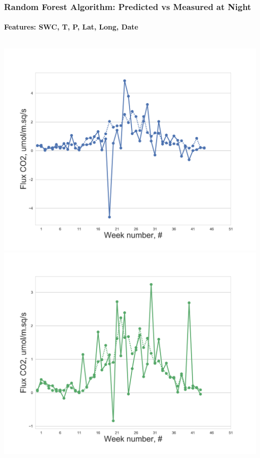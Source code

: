 \documentclass{beamer}
\begin{document}
\begin{frame}
\frametitle{Random Forest Algorithm: Predicted vs Measured at Night}
\framesubtitle{Features: SWC, T, P, Lat, Long, Date}
\begin{columns}[t]
\centering
\includegraphics[width=\textwidth]{F_ML/0.png}\\
\includegraphics[width=\textwidth]{F_ML/1.png}


\end{columns}
\end{frame}
\end{document}
